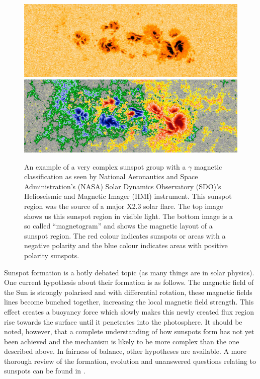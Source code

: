 	\begin{figure}
		\centering
		\includegraphics[width=\textwidth]{sunspot.jpg}\\
		\includegraphics[width=\textwidth]{sunspot_magnetic.jpg}\\
		\caption{
				 An example of a very complex sunspot group with a $\gamma$ magnetic classification as seen by National Aeronautics and Space Administration's (NASA) Solar Dynamics Observatory (SDO)'s Helioseismic and Magnetic Imager (HMI) instrument.
				 This sunspot region was the source of a major X2.3 solar flare.
				 The top image shows us this sunspot region in visible light.
				 The bottom image is a so called ``magnetogram'' and shows the magnetic layout of a sunspot region.
				 The red colour indicates sunspots or areas with a negative polarity and the blue colour indicates areas with positive polarity sunspots.	
				}
		\label{fig:AR_Mag}
	\end{figure}

\cite{lrsp-2011-3}
\cite{2011IAUS..273....8R}

    Sunspot formation is a hotly debated topic (as many things are in solar physics).
    One current hypothesis about their formation is as follows.
    The magnetic field of the Sun is strongly polarised and with differential rotation, these magnetic fields lines become bunched together, increasing the local magnetic field strength.
    This effect creates a buoyancy force which slowly makes this newly created flux region rise towards the surface until it penetrates into the photosphere.
    It should be noted, however, that a complete understanding of how sunspots form has not yet been achieved and the mechanism is likely to be more complex than the one described above.
    In fairness of balance, other hypotheses are available.
    A more thorough review of the formation, evolution and unanswered questions relating to sunspots can be found in \cite{SAO}.
    
